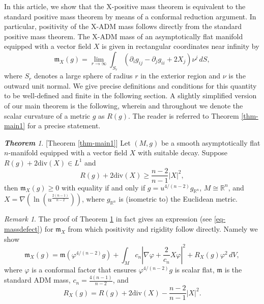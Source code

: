 \documentclass[a4paper,11pt,reqno]{amsart}
\theoremstyle{plain}
\theoremstyle{definition}
\theoremstyle{remark}
\newtheorem{rem}[thm]{Remark}
\newcommand{\m}{\mathfrak{m}}
\numberwithin{equation}{section}
\newtheorem{introthm}{\bf Theorem}
\begin{document}
In this article, we show that the X-positive mass theorem is equivalent to the standard positive mass theorem by means of a conformal reduction argument. In particular, positivity of the X-ADM mass follows directly from the standard positive mass theorem. The X-ADM mass of an asymptotically flat manifold equipped with a vector field $X$ is given in rectangular coordinates near infinity by
\begin{equation}
	\m_X(g)=\lim_{r\to \infty}\int_{S_r} \left(\partial_i g_{ij}-\partial_jg_{ii}+2X_j\right)\nu^j\,dS,
\end{equation}
where $S_r$ denotes a large sphere of radius $r$ in the exterior region and $\nu$ is the outward unit normal. We give precise definitions and conditions for this quantity to be well-defined and finite in the following section. A slightly simplified version of our main theorem is the following, wherein and throughout we denote the scalar curvature of a metric $g$ as $R(g)$. The reader is referred to Theorem \ref{thm-main1} for a precise statement.
\begin{introthm}\label{thm-intro1}[Theorem \ref{thm-main1}]
	Let $(M,g)$ be a smooth asymptotically flat $n$-manifold equipped with a vector field $X$ with suitable decay. 
	Suppose $R(g)+2\mathrm{div}(X)\in L^1$ and
	\begin{equation} \label{eq-introRcond}
		R(g)+2\mathrm{div}(X)\geq\frac{n-2}{n-1}|X|^2,
	\end{equation}
	then $\m_X(g)\geq0$ with equality if and only if $g=u^{4/(n-2)}g_{\mathbb R^n}$, $M\cong\mathbb R^n$, and $X=\nabla(\ln(u^{\frac{2(n-1)}{n-2}}))$, where $g_{\mathbb R^n}$ is (isometric to) the Euclidean metric.
\end{introthm}
\begin{rem}
The proof of Theorem \ref{thm-intro1} in fact gives an expression (see \eqref{eq-massdefect}) for $\m_X$ from which positivity and rigidity follow directly. Namely we show
\begin{equation*}
	\m_X(g)=	\m(\varphi^{4/(n-2)}g)+\int_{M} c_n\left| \nabla\varphi+\frac{2}{c_n}X\varphi\right|^2+R_X(g)\varphi^2\,dV,	
\end{equation*}
where $\varphi$ is a conformal factor that ensures $\varphi^{4/(n-2)}g$ is scalar flat, $\m$ is the standard ADM mass, $c_n=\frac{4(n-1)}{n-2}$, and 
\begin{equation*}
	R_X(g)=R(g)+2\mathrm{div}(X)-\frac{n-2}{n-1}|X|^2.
\end{equation*}
\end{rem}
\end{document}
